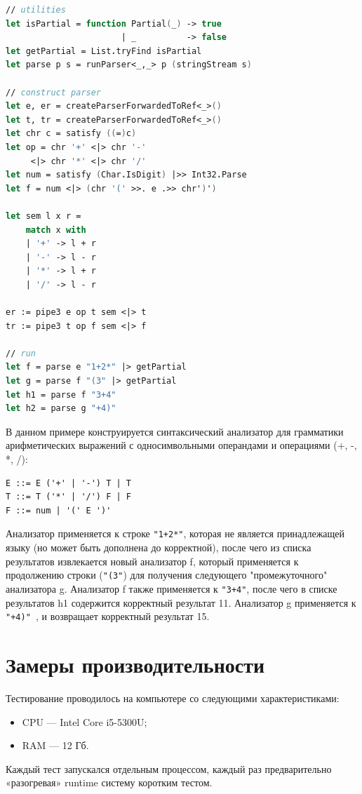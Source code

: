 \documentclass[14pt]{matmex-diploma}
\begin{document}
\begin{lstlisting}[language=FSharp]
// utilities
let isPartial = function Partial(_) -> true 
                       | _          -> false
let getPartial = List.tryFind isPartial
let parse p s = runParser<_,_> p (stringStream s)

// construct parser
let e, er = createParserForwardedToRef<_>()
let t, tr = createParserForwardedToRef<_>()
let chr c = satisfy ((=)c) 
let op = chr '+' <|> chr '-' 
     <|> chr '*' <|> chr '/'
let num = satisfy (Char.IsDigit) |>> Int32.Parse
let f = num <|> (chr '(' >>. e .>> chr')')

let sem l x r = 
    match x with 
    | '+' -> l + r 
    | '-' -> l - r
    | '*' -> l + r 
    | '/' -> l - r
    
er := pipe3 e op t sem <|> t
tr := pipe3 t op f sem <|> f

// run
let f = parse e "1+2*" |> getPartial 
let g = parse f "(3" |> getPartial
let h1 = parse f "3+4"
let h2 = parse g "+4)"
\end{lstlisting}

В данном примере конструируется синтаксический анализатор для грамматики арифметических выражений 
с односимвольными операндами и операциями (+, -, *, /):
\begin{lstlisting}
E ::= E ('+' | '-') T | T
T ::= T ('*' | '/') F | F
F ::= num | '(' E ')' 
\end{lstlisting}
Анализатор применяется к строке {\tt "1+2*"}, которая не является принадлежащей языку 
  (но может быть дополнена до корректной), после чего из списка результатов 
  извлекается новый анализатор f, который применяется к продолжению строки 
  ({\tt "(3"}) для получения следующего "промежуточного" анализатора g. Анализатор f также
  применяется к {\tt "3+4"}, после чего в списке результатов h1 содержится корректный
  результат 11. Анализатор g применяется к {\tt "+4)" }, и возвращает корректный результат 15.






\section{Замеры производительности}

Тестирование проводилось на компьютере со следующими характеристиками:
\begin{itemize}
    \item CPU --- Intel Core i5-5300U;
    \item RAM --- 12 Гб.
\end{itemize}
Каждый тест запускался отдельным процессом, каждый раз предварительно «разогревая» runtime 
систему коротким тестом.\\
\end{document}
